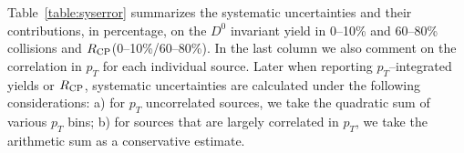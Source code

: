 \documentclass[%
 reprint,	
showpacs,
 amsmath,amssymb,
 aps,
 prc,
]{revtex4-1}
\begin{document}
\begin{table}
\label{table:syserror}
\end{table}


Table~\ref{table:syserror} summarizes the systematic uncertainties and their contributions, in percentage, on the $D^0$ invariant yield in 0--10\% and 60--80\% collisions and $R_{\rm CP}$(0--10\%/60--80\%). In the last column we also comment on the correlation in $p_{T}$ for each individual source. Later when reporting $p_{T}$--integrated yields or $R_{\rm CP}$, systematic uncertainties are calculated under the following considerations: a) for $p_{T}$ uncorrelated sources, we take the quadratic sum of various $p_{T}$ bins; b) for sources that are largely correlated in $p_{T}$, we take the arithmetic sum as a conservative estimate.
\end{document}
